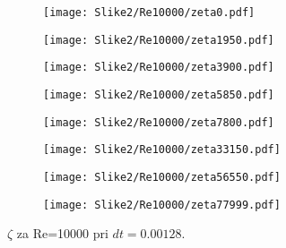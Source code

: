 \documentclass[12pt,a4paper]{article}
\begin{document}
\begin{figure}[H]
    \centering
    \begin{subfigure}[b]{0.2\textwidth}  			
        \texttt{[image: Slike2/Re10000/zeta0.pdf]}
    \end{subfigure}
    \begin{subfigure}[b]{0.2\textwidth}  			
        \texttt{[image: Slike2/Re10000/zeta1950.pdf]}
    \end{subfigure}
    \begin{subfigure}[b]{0.2\textwidth}  			
        \texttt{[image: Slike2/Re10000/zeta3900.pdf]}
    \end{subfigure}
        \begin{subfigure}[b]{0.2\textwidth}  			
        \texttt{[image: Slike2/Re10000/zeta5850.pdf]}
    \end{subfigure}
 
     \begin{subfigure}[b]{0.2\textwidth}  			
        \texttt{[image: Slike2/Re10000/zeta7800.pdf]}
    \end{subfigure}
        \begin{subfigure}[b]{0.2\textwidth}  			
        \texttt{[image: Slike2/Re10000/zeta33150.pdf]}
    \end{subfigure}
        \begin{subfigure}[b]{0.2\textwidth}  			
        \texttt{[image: Slike2/Re10000/zeta56550.pdf]}
    \end{subfigure}
        \begin{subfigure}[b]{0.2\textwidth}  			
        \texttt{[image: Slike2/Re10000/zeta77999.pdf]}
    \end{subfigure}
    \caption{$\zeta$ za Re=10000 pri $dt=0.00128$.} \label{fig:slika8}
\end{figure}
\end{document}
